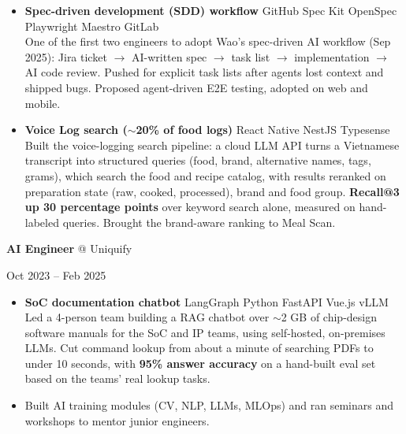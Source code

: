 \documentclass[10pt, a4paper]{article}
\newcommand{\stacktag}[1]{{\setlength{\fboxsep}{1 pt}\colorbox{tagColor}{\fontsize{7.6 pt}{9 pt}\selectfont\color{primaryColor}#1}}}
\newenvironment{highlights}{
    \begin{itemize}[
        topsep=1.5 pt,
        parsep=0pt,
        partopsep=0pt,
        itemsep=1.5 pt,
        leftmargin=12 pt
    ]
}{
    \end{itemize}
} %
\newenvironment{twocolentry}[2][]{
    \def\secondColumn{#2}
    \par
}{
    \unskip\hfill\secondColumn\par
} %
\begin{document}
\begin{highlights}
            \item \textbf{Spec-driven development (SDD) workflow} \stacktag{GitHub Spec Kit} \stacktag{OpenSpec} \stacktag{Playwright} \stacktag{Maestro} \stacktag{GitLab}\\
            One of the first two engineers to adopt Wao's spec-driven AI workflow (Sep 2025): Jira ticket $\rightarrow$ AI-written spec $\rightarrow$ task list $\rightarrow$ implementation $\rightarrow$ AI code review. Pushed for explicit task lists after agents lost context and shipped bugs. Proposed agent-driven E2E testing, adopted on web and mobile.
            \item \textbf{Voice Log search ($\sim$20\% of food logs)} \stacktag{React Native} \stacktag{NestJS} \stacktag{Typesense}\\
            Built the voice-logging search pipeline: a cloud LLM API turns a Vietnamese transcript into structured queries (food, brand, alternative names, tags, grams), which search the food and recipe catalog, with results reranked on preparation state (raw, cooked, processed), brand and food group. \textbf{Recall@3 up 30 percentage points} over keyword search alone, measured on hand-labeled queries. Brought the brand-aware ranking to Meal Scan.
        \end{highlights}

        \vspace{3 pt}

        \begin{twocolentry}{Oct 2023 -- Feb 2025}
            \textbf{AI Engineer} @ Uniquify
        \end{twocolentry}
        \begin{highlights}
            \item \textbf{SoC documentation chatbot} \stacktag{LangGraph Python} \stacktag{FastAPI} \stacktag{Vue.js} \stacktag{vLLM}\\
            Led a 4-person team building a RAG chatbot over $\sim$2 GB of chip-design software manuals for the SoC and IP teams, using self-hosted, on-premises LLMs. Cut command lookup from about a minute of searching PDFs to under 10 seconds, with \textbf{95\% answer accuracy} on a hand-built eval set based on the teams' real lookup tasks.
            \item Built AI training modules (CV, NLP, LLMs, MLOps) and ran seminars and workshops to mentor junior engineers.
        \end{highlights}

        \vspace{3 pt}
\end{document}
